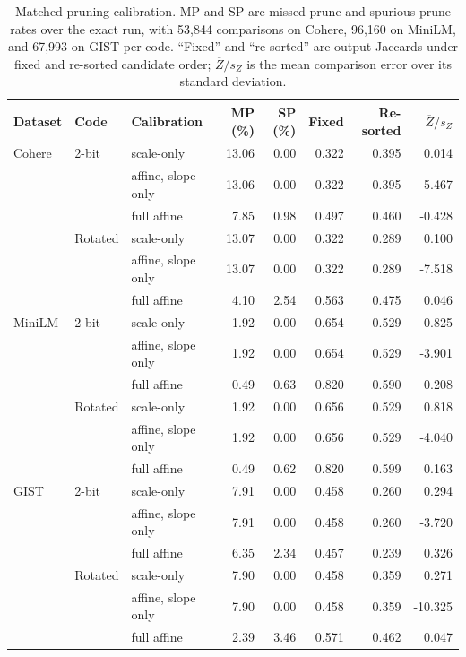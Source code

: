 \begin{table}[tbp]
\centering


\small
\setlength{\tabcolsep}{4pt}
\begin{tabular}{lllrrrrr}
\toprule
Dataset & Code & Calibration & MP (\%) & SP (\%) & Fixed & Re-sorted & $\overline Z/s_Z$ \\
\midrule
Cohere & 2-bit & scale-only & 13.06 & 0.00 & 0.322 & 0.395 & 0.014 \\
 &  & affine, slope only & 13.06 & 0.00 & 0.322 & 0.395 & -5.467 \\
 &  & full affine & 7.85 & 0.98 & 0.497 & 0.460 & -0.428 \\
 & Rotated & scale-only & 13.07 & 0.00 & 0.322 & 0.289 & 0.100 \\
 &  & affine, slope only & 13.07 & 0.00 & 0.322 & 0.289 & -7.518 \\
 &  & full affine & 4.10 & 2.54 & 0.563 & 0.475 & 0.046 \\
\addlinespace
MiniLM & 2-bit & scale-only & 1.92 & 0.00 & 0.654 & 0.529 & 0.825 \\
 &  & affine, slope only & 1.92 & 0.00 & 0.654 & 0.529 & -3.901 \\
 &  & full affine & 0.49 & 0.63 & 0.820 & 0.590 & 0.208 \\
 & Rotated & scale-only & 1.92 & 0.00 & 0.656 & 0.529 & 0.818 \\
 &  & affine, slope only & 1.92 & 0.00 & 0.656 & 0.529 & -4.040 \\
 &  & full affine & 0.49 & 0.62 & 0.820 & 0.599 & 0.163 \\
\addlinespace
GIST & 2-bit & scale-only & 7.91 & 0.00 & 0.458 & 0.260 & 0.294 \\
 &  & affine, slope only & 7.91 & 0.00 & 0.458 & 0.260 & -3.720 \\
 &  & full affine & 6.35 & 2.34 & 0.457 & 0.239 & 0.326 \\
 & Rotated & scale-only & 7.90 & 0.00 & 0.458 & 0.359 & 0.271 \\
 &  & affine, slope only & 7.90 & 0.00 & 0.458 & 0.359 & -10.325 \\
 &  & full affine & 2.39 & 3.46 & 0.571 & 0.462 & 0.047 \\
\bottomrule
\end{tabular}

\small
\caption{Matched pruning calibration. MP and SP are missed-prune and spurious-prune rates over the exact run, with 53{,}844 comparisons on Cohere, 96{,}160 on MiniLM, and 67{,}993 on GIST per code. ``Fixed'' and ``re-sorted'' are output Jaccards under fixed and re-sorted candidate order; $\overline Z/s_Z$ is the mean comparison error over its standard deviation.}
\label{tab:app-pruning-calibration}
\end{table}

